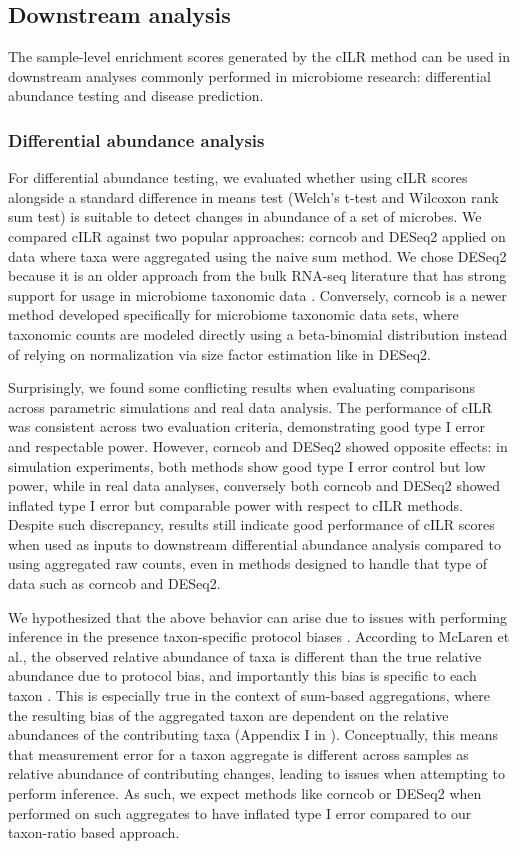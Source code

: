 \documentclass[10pt,letterpaper]{article}
\begin{document}
\subsection*{Downstream analysis}
The sample-level enrichment scores generated by the cILR method can be used in downstream analyses commonly performed in microbiome research: differential abundance testing and disease prediction.

\subsubsection*{Differential abundance analysis}
For differential abundance testing, we evaluated whether using cILR scores alongside a standard difference in means test (Welch's t-test and Wilcoxon rank sum test) is suitable to detect changes in abundance of a set of microbes. We compared cILR against two popular approaches: corncob \cite{martin2020} and DESeq2 \cite{love2014} applied on data where taxa were aggregated using the naive sum method. We chose DESeq2 because it is an older approach from the bulk RNA-seq literature that has strong support for usage in microbiome taxonomic data \cite{mcmurdie2014}. Conversely, corncob is a newer method developed specifically for microbiome taxonomic data sets, where taxonomic counts are modeled directly using a beta-binomial distribution instead of relying on normalization via size factor estimation like in DESeq2. 

Surprisingly, we found some conflicting results when evaluating comparisons across parametric simulations and real data analysis. The performance of cILR was consistent across two evaluation criteria, demonstrating good type I error and respectable power. However, corncob and DESeq2 showed opposite effects: in simulation experiments, both methods show good type I error control but low power, while in real data analyses, conversely both corncob and DESeq2 showed inflated type I error but comparable power with respect to cILR methods. Despite such discrepancy, results still indicate good performance of cILR scores when used as inputs to downstream differential abundance analysis compared to using aggregated raw counts, even in methods designed to handle that type of data such as corncob and DESeq2.

We hypothesized that the above behavior can arise due to issues with performing inference in the presence taxon-specific protocol biases \cite{mclaren2019}. According to McLaren et al., the observed relative abundance of taxa is different than the true relative abundance due to protocol bias, and importantly this bias is specific to each taxon \cite{mclaren2019}. This is especially true in the context of sum-based aggregations, where the resulting bias of the aggregated taxon are dependent on the relative abundances of the contributing taxa (Appendix I in \cite{mclaren2019}). Conceptually, this means that measurement error for a taxon aggregate is different across samples as relative abundance of contributing changes, leading to issues when attempting to perform inference. As such, we expect methods like corncob or DESeq2 when performed on such aggregates to have inflated type I error compared to our taxon-ratio based approach.  
\end{document}
